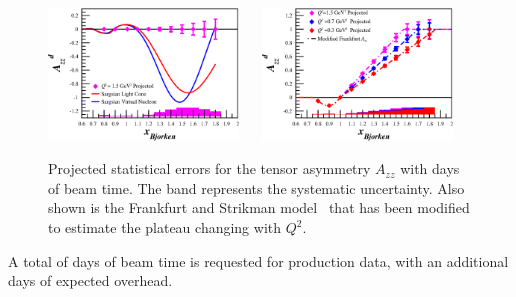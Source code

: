\begin{figure}
\begin{center}
\includegraphics[width=0.45\textwidth]{figs/Pzz_30_q2_15_Azz_w_misak.eps} ~~ \includegraphics[width=0.45\textwidth]{figs/Pzz_30_Azz_combo.eps} 
\caption{\label{PROJ}Projected statistical errors for the tensor asymmetry $A_{zz}$ with \productiondays days of beam time. The band represents the systematic uncertainty. Also shown is the Frankfurt and Strikman model~\cite{Frankfurt:1988nt} that has been modified to estimate the plateau changing with $Q^2$.
}
\end{center}
\end{figure}

A total of \productiondays days of beam time is requested for production data, with an additional \overheaddays days of expected overhead.



\clearpage

%






